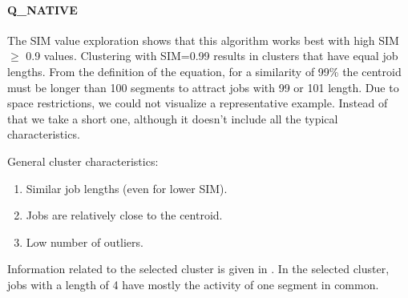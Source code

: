 \documentclass{jhps}
\begin{document}
\FloatBarrier
\paragraph{Q\_NATIVE}
The SIM value exploration shows that this algorithm works best with high SIM $\geq$ 0.9 values.
Clustering with SIM=0.99 results in clusters that have equal job lengths.
From the definition of the equation, for a similarity of 99\% the centroid must be longer than 100 segments to attract jobs with 99 or 101 length.
Due to space restrictions, we could not visualize a representative example.
Instead of that we take a short one, although it doesn't include all the typical characteristics.

General cluster characteristics:
\begin{enumerate}
 \item Similar job lengths (even for lower SIM).
 \item Jobs are relatively close to the centroid.
 \item Low number of outliers.
\end{enumerate}

Information related to the selected cluster is given in .
In the selected cluster, jobs with a length of 4 have mostly the activity of one segment in common.
\end{document}
